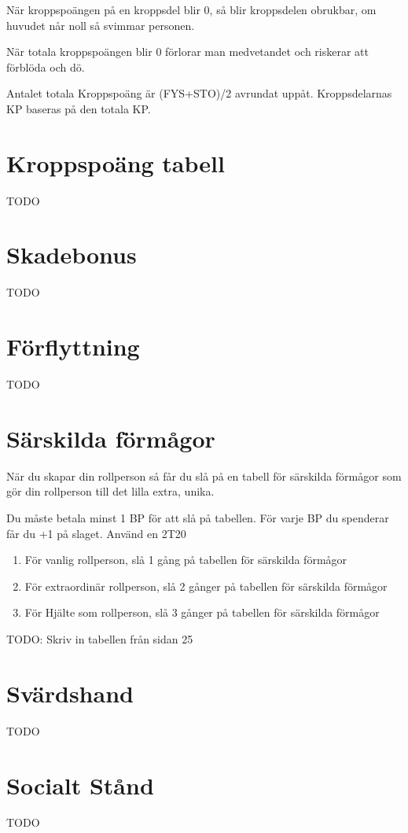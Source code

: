 \documentclass[a4paper, 10pt, titlepage]{article}
\begin{document}
När kroppspoängen på en kroppsdel blir 0, så blir kroppsdelen obrukbar, om huvudet når noll så svimmar personen.

När totala kroppspoängen blir 0 förlorar man medvetandet och riskerar att förblöda och dö.

Antalet totala Kroppspoäng är (FYS+STO)/2 avrundat uppåt. Kroppsdelarnas KP baseras på den totala KP.

\section{Kroppspoäng tabell}

TODO

\section{Skadebonus}

TODO

\section{Förflyttning}

TODO

\section{Särskilda förmågor}
När du skapar din rollperson så får du slå på en tabell för särskilda förmågor
som gör din rollperson till det lilla extra, unika.

Du måste betala minst 1 BP för att slå på tabellen. För varje BP du spenderar
får du +1 på slaget. Använd en 2T20

\begin{enumerate}[x]
  \item För vanlig rollperson, slå 1 gång på tabellen för särskilda förmågor
  \item För extraordinär rollperson, slå 2 gånger på tabellen för särskilda förmågor
  \item För Hjälte som rollperson, slå 3 gånger på tabellen för särskilda förmågor
\end{enumerate}

TODO: Skriv in tabellen från sidan 25

\section{Svärdshand}
TODO

\section{Socialt Stånd}
TODO
\end{document}
